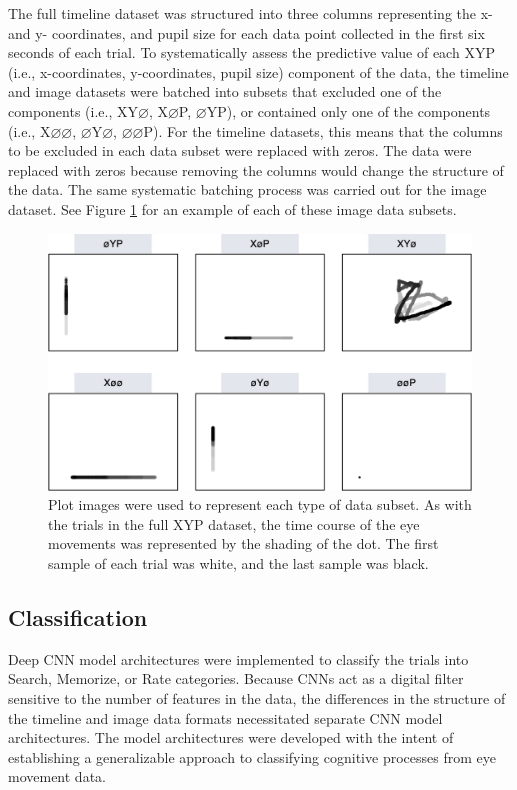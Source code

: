 \documentclass[
  english,
  man,floatsintext]{apa6}
\begin{document}
The full timeline dataset was structured into three columns representing the x- and y- coordinates, and pupil size for each data point collected in the first six seconds of each trial. To systematically assess the predictive value of each XYP (i.e., x-coordinates, y-coordinates, pupil size) component of the data, the timeline and image datasets were batched into subsets that excluded one of the components (i.e., XY\(\varnothing\), X\(\varnothing\)P, \(\varnothing\)YP), or contained only one of the components (i.e., X\(\varnothing\varnothing\), \(\varnothing\)Y\(\varnothing\), \(\varnothing\varnothing\)P). For the timeline datasets, this means that the columns to be excluded in each data subset were replaced with zeros. The data were replaced with zeros because removing the columns would change the structure of the data. The same systematic batching process was carried out for the image dataset. See Figure \ref{fig:ave-subset} for an example of each of these image data subsets.

\begin{figure}
\centering
\includegraphics{figures/subset_imgs.png}
\caption{\label{fig:ave-subset}Plot images were used to represent each type of data subset. As with the trials in the full XYP dataset, the time course of the eye movements was represented by the shading of the dot. The first sample of each trial was white, and the last sample was black.}
\end{figure}

\subsection{Classification}

Deep CNN model architectures were implemented to classify the trials into Search, Memorize, or Rate categories. Because CNNs act as a digital filter sensitive to the number of features in the data, the differences in the structure of the timeline and image data formats necessitated separate CNN model architectures. The model architectures were developed with the intent of establishing a generalizable approach to classifying cognitive processes from eye movement data.
\end{document}
